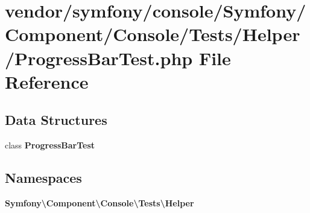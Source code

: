 \section{vendor/symfony/console/\+Symfony/\+Component/\+Console/\+Tests/\+Helper/\+Progress\+Bar\+Test.php File Reference}
\label{_progress_bar_test_8php}
\subsection*{Data Structures}
\begin{DoxyCompactItemize}
\item 
class {\bf Progress\+Bar\+Test}
\end{DoxyCompactItemize}
\subsection*{Namespaces}
\begin{DoxyCompactItemize}
\item 
 {\bf Symfony\textbackslash{}\+Component\textbackslash{}\+Console\textbackslash{}\+Tests\textbackslash{}\+Helper}
\end{DoxyCompactItemize}

